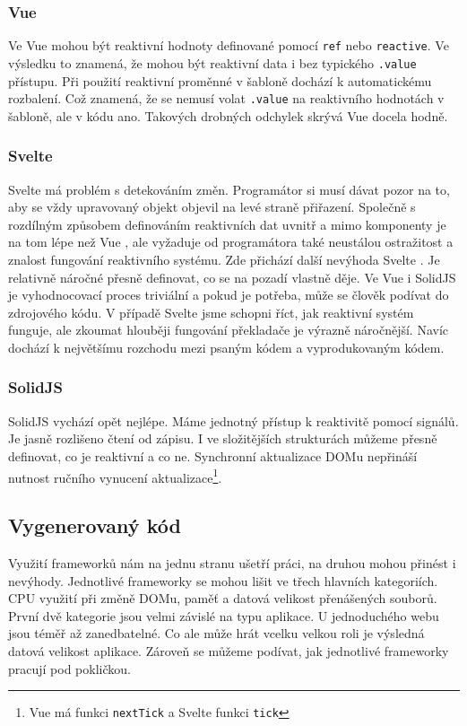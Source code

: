 \documentclass[
  master,
  program=ainf,
  tables=false,
  sourcecodes,
  glossaries,
  index
]{kidiplom}
\begin{document}
\subsubsection{Vue}
Ve Vue \cite{vue} mohou být reaktivní hodnoty definované pomocí {\tt ref} nebo {\tt reactive}. Ve výsledku to znamená, že mohou být 
reaktivní data i bez typického {\tt .value} přístupu. Při použití reaktivní proměnné v šabloně dochází k automatickému
rozbalení. Což znamená, že se nemusí volat {\tt .value} na reaktivního hodnotách v šabloně, ale v kódu ano. Takových 
drobných odchylek skrývá Vue \cite{vue} docela hodně.

\subsubsection{Svelte}
Svelte \cite{svelte} má problém s detekováním změn. Programátor si musí dávat pozor na to, aby se vždy upravovaný objekt
objevil na levé straně přiřazení. Společně s rozdílným způsobem definováním reaktivních dat uvnitř a mimo komponenty
je na tom lépe než Vue \cite{vue}, ale vyžaduje od programátora také neustálou ostražitost a znalost fungování reaktivního 
systému. Zde přichází další nevýhoda Svelte \cite{svelte}. Je relativně náročné přesně definovat, co se na pozadí vlastně děje.
Ve Vue \cite{vue} i SolidJS \cite{solidjs} je vyhodnocovací proces triviální a pokud je potřeba, může se člověk podívat do zdrojového kódu.
V případě Svelte \cite{svelte} jsme schopni říct, jak reaktivní systém funguje, ale zkoumat hlouběji fungování překladače je
výrazně náročnější. Navíc dochází k největšímu rozchodu mezi psaným kódem a vyprodukovaným kódem.

\subsubsection{SolidJS}
SolidJS \cite{solidjs} vychází opět nejlépe. Máme jednotný přístup k reaktivitě pomocí signálů. Je jasně rozlišeno čtení od zápisu.
I ve složitějších strukturách můžeme přesně definovat, co je reaktivní a co ne. Synchronní aktualizace DOMu nepřináší
nutnost ručního vynucení aktualizace\footnote{Vue má funkci {\tt nextTick} a Svelte funkci {\tt tick}}.

\subsection{Vygenerovaný kód}

Využití frameworků nám na jednu stranu ušetří práci, na druhou mohou přinést i nevýhody.
Jednotlivé frameworky se mohou lišit ve třech hlavních kategoriích. CPU využití při změně DOMu,
paměť a datová velikost přenášených souborů. První dvě kategorie jsou velmi závislé na typu aplikace.
U jednoduchého webu jsou téměř až zanedbatelné. Co ale může hrát vcelku velkou roli je výsledná
datová velikost aplikace. Zároveň se můžeme podívat, jak jednotlivé frameworky pracují pod pokličkou. 
\end{document}
